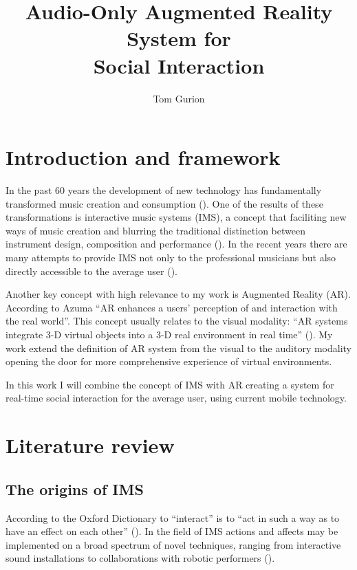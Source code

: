 \documentclass[a4paper,11pt]{article}
\title{Audio-Only Augmented Reality System for\\Social Interaction}
\author{Tom Gurion}
\begin{document}
\maketitle

\section{Introduction and framework}

In the past 60 years the development of new technology has fundamentally transformed music creation and consumption (\cite{hargreaves99}).
One of the results of these transformations is interactive music systems (IMS), a concept that faciliting new ways of music creation and blurring the traditional distinction between instrument design, composition and performance (\cite{drummond09}).
In the recent years there are many attempts to provide IMS not only to the professional musicians but also directly accessible to the average user ().


Another key concept with high relevance to my work is Augmented Reality (AR).
According to Azuma ``AR enhances a users' perception of and interaction with the real world''.
This concept usually relates to the visual modality: ``AR systems integrate 3-D virtual objects into a 3-D real environment in real time'' (\cite{azuma97}).
My work extend the definition of AR system from the visual to the auditory modality opening the door for more comprehensive experience of virtual environments.

In this work I will combine the concept of IMS with AR creating a system for real-time social interaction for the average user, using current mobile technology.

\section{Literature review}

\subsection{The origins of IMS}

According to the Oxford Dictionary to ``interact'' is to ``act in such a way as to have an effect on each other'' (\citeauthor{web:oxford}).
In the field of IMS actions and affects may be implemented on a broad spectrum of novel techniques, ranging from interactive sound installations to collaborations with robotic performers (\cite{drummond09}).
\end{document}
